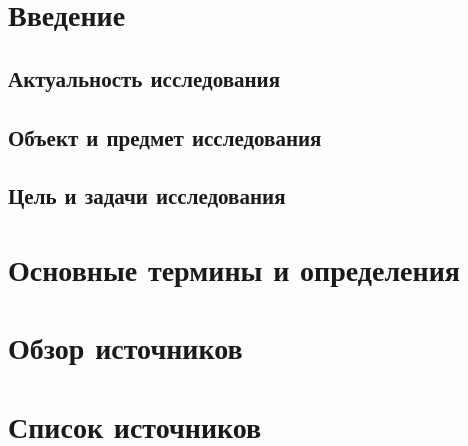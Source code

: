 \documentclass[a4paper]{article}
\begin{document}
\section{Введение}

\subsection{Актуальность исследования}

\subsection{Объект и предмет исследования}

\subsection{Цель и задачи исследования}

\newpage

\section{Основные термины и определения}

\newpage

\section{Обзор источников}

\newpage

\section{Список источников}
\end{document}
